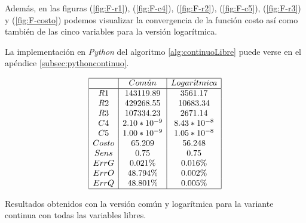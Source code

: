 \documentclass{llncs}
\begin{document}
	Además, en las figuras (\ref{fig:F-r1}), (\ref{fig:F-c4}), (\ref{fig:F-r2}), (\ref{fig:F-c5}), (\ref{fig:F-r3}) y (\ref{fig:F-costo}) 
	podemos visualizar la convergencia de la función costo así como también de las cinco variables para la versión logarítmica.
	
	La implementación en \textit{Python} del algoritmo \ref{alg:continuoLibre} puede verse en el apéndice \ref{subsec:pythoncontinuo}.
	
	\begin{table}[!h]
		$$
		\begin{array}{|c|c|c|}
		\hline
		 & Com\acute{u}n & Logar\acute{\imath}tmica \\
                \hline
                R1 & 143119.89  & 3561.17 \\
                R2 & 429268.55 & 10683.34 \\
                R3 & 107334.23  & 2671.14 \\
                C4 & 2.10*10^{-9}  & 8.43*10^{-8}\\
                C5 & 1.00*10^{-9} & 1.05*10^{-8}\\
                Costo & 65.209 &  56.248\\
                Sens & 0.75 & 0.75 \\
                ErrG & 0.021\%  & 0.016\%\\
                ErrO & 48.794\%  &  0.002\%\\
                ErrQ & 48.801\%  &  0.005\%\\
		\hline
		\end{array}
		$$
		\caption{Resultados obtenidos con la versión común y logarítmica para la variante continua con todas las variables libres.}
		\label{cuadroSols1}
	\end{table}
	
\end{document}
